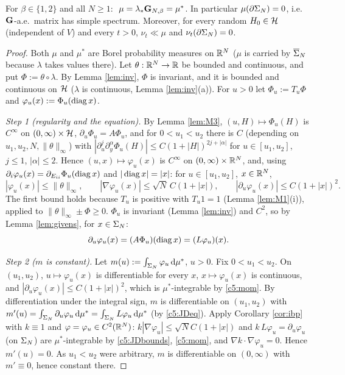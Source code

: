 \begin{theorem}\label{thm:JD}
For $\beta\in\{1,2\}$ and all $N\ge1$: $\ \mu=\lambda_*\mathbf{G}_{N,\beta}=\mu^*$. In particular $\mu(\partial\Sigma_N)=0$, i.e.\ $\mathbf{G}$-a.e.\ matrix has simple spectrum.
Moreover, for every random $H_0\in\mathcal{H}$ (independent of $V$) and every $t>0$, $\nu_t\ll\mu$ and $\nu_t(\partial\Sigma_N)=0$.
\end{theorem}

\begin{proof}
Both $\mu$ and $\mu^*$ are Borel probability measures on $\mathbb{R}^N$ ($\mu$ is carried by $\overline{\Sigma}_N$ because $\lambda$ takes values there). Let $\theta:\mathbb{R}^N\to\mathbb{R}$ be bounded and continuous, and put $\Phi:=\theta\circ\lambda$.
By Lemma \ref{lem:inv}, $\Phi$ is invariant, and it is bounded and continuous on $\mathcal{H}$ ($\lambda$ is continuous, Lemma \ref{lem:inv}(a)). For $u>0$ let $\Phi_u:=T_u\Phi$ and $\varphi_u(x):=\Phi_u(\operatorname{diag} x)$.

\emph{Step 1 (regularity and the equation).} By Lemma \ref{lem:M3}, $(u,H)\mapsto\Phi_u(H)$ is $C^\infty$ on $(0,\infty)\times\mathcal{H}$, $\partial_u\Phi_u=A\Phi_u$, and for $0<u_1<u_2$ there is $C$ (depending on $u_1,u_2,N,\|\theta\|_\infty$) with
$|\partial_u^j\partial^\alpha_y\Phi_u(H)|\le C(1+|H|)^{2j+|\alpha|}$ for $u\in[u_1,u_2]$, $j\le1$, $|\alpha|\le2$.
Hence $(u,x)\mapsto\varphi_u(x)$ is $C^\infty$ on $(0,\infty)\times\mathbb{R}^N$, and, using $\partial_i\varphi_u(x)=\partial_{E_{ii}}\Phi_u(\operatorname{diag} x)$ and $|\operatorname{diag} x|=|x|$: for $u\in[u_1,u_2]$, $x\in\mathbb{R}^N$,
\begin{equation}\label{c5:JDbounds}
|\varphi_u(x)|\le\|\theta\|_\infty,\qquad|\nabla\varphi_u(x)|\le\sqrt N\,C(1+|x|),\qquad|\partial_u\varphi_u(x)|\le C(1+|x|)^2 .
\end{equation}
The first bound holds because $T_u$ is positive with $T_u1=1$ (Lemma \ref{lem:M1}(i)), applied to $\|\theta\|_\infty\pm\Phi\ge0$.
$\Phi_u$ is invariant (Lemma \ref{lem:inv}) and $C^2$, so by Lemma \ref{lem:givens}, for $x\in\Sigma_N$:
\begin{equation}\label{c5:JDeq}
\partial_u\varphi_u(x)=(A\Phi_u)(\operatorname{diag} x)=(L\varphi_u)(x).
\end{equation}

\emph{Step 2 ($m$ is constant).} Let $m(u):=\int_{\Sigma_N}\varphi_u\,\mathrm{d}\mu^*$, $u>0$. Fix $0<u_1<u_2$. On $(u_1,u_2)$, $u\mapsto\varphi_u(x)$ is differentiable for every $x$, $x\mapsto\varphi_u(x)$ is continuous, and $|\partial_u\varphi_u(x)|\le C(1+|x|)^2$, which is $\mu^*$-integrable by \eqref{c5:mom}. By differentiation under the integral sign, $m$ is differentiable on $(u_1,u_2)$ with
$m'(u)=\int_{\Sigma_N}\partial_u\varphi_u\,\mathrm{d}\mu^*=\int_{\Sigma_N}L\varphi_u\,\mathrm{d}\mu^*$ (by \eqref{c5:JDeq}).
Apply Corollary \ref{cor:ibp} with $k\equiv1$ and $\varphi=\varphi_u\in C^2(\mathbb{R}^N)$: $k|\nabla\varphi_u|\le\sqrt NC(1+|x|)$ and $k\,L\varphi_u=\partial_u\varphi_u$ (on $\Sigma_N$) are $\mu^*$-integrable by \eqref{c5:JDbounds}, \eqref{c5:mom}, and $\nabla k\cdot\nabla\varphi_u=0$. Hence $m'(u)=0$.
As $u_1<u_2$ were arbitrary, $m$ is differentiable on $(0,\infty)$ with $m'\equiv0$, hence constant there.


\end{proof}
